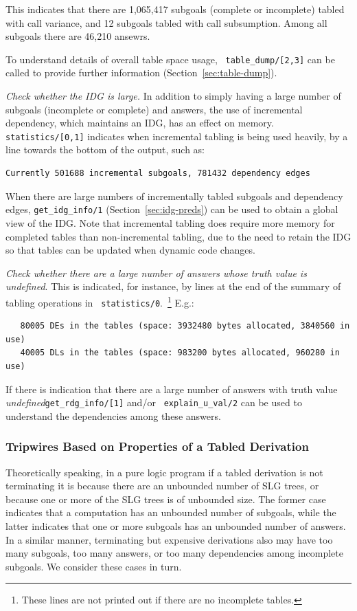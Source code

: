 This indicates that there are 1,065,417 subgoals (complete or
 incomplete) tabled with call variance, and 12 subgoals tabled with
 call subsumption.  Among all subgoals there are 46,210 ansewrs.  
%
\bi
\item To understand details of overall table space usage, {\tt
  table\_dump/[2,3]} can be called to provide further information
  (Section~\ref{sec:table-dump}).  
\ei
%
\item {\em Check whether the IDG is large.}  In addition to simply
  having a large number of subgoals (incomplete or complete) and
  answers, the use of incremental dependency, which maintains an IDG,
  has an effect on memory.  {\tt statistics/[0,1]} indicates when
  incremental tabling is being used heavily, by a line towards the
  bottom of the output, such as:
{\small \begin{verbatim}
Currently 501688 incremental subgoals, 781432 dependency edges
\end{verbatim} }
%
\bi
\item When there are large numbers of incrementally tabled subgoals
  and dependency edges, {\tt get\_idg\_info/1}
  (Section~\ref{sec:idg-preds}) can be used to obtain a global view of
  the IDG.  Note that incremental tabling does require more memory for
  completed tables than non-incremental tabling, due to the need to
  retain the IDG so that tables can be updated when dynamic code
  changes.
%
\ei
\item {\em Check whether there are a large number of answers whose
  truth value is {\em undefined}}.  This is indicated, for instance,
  by lines at the end of the summary of tabling operations in {\tt
    statistics/0}.~\footnote{These lines are not printed out if there are no
    incomplete tables.}  E.g.:
{\small \begin{verbatim}
   80005 DEs in the tables (space: 3932480 bytes allocated, 3840560 in use)
   40005 DLs in the tables (space: 983200 bytes allocated, 960280 in use)
\end{verbatim} }
%
\bi
If there is indication that there are a large number of answers with
 truth value {\em undefined}{\tt get\_rdg\_info/[1]} and/or {\tt
 explain\_u\_val/2} can be used to understand the dependencies among
 these answers.  
\ei
\ei

\subsubsection{Tripwires Based on Properties of a Tabled Derivation}
%
Theoretically speaking, in a pure logic program if a tabled derivation
 is not terminating it is because there are an unbounded number of SLG
 trees, or because one or more of the SLG trees is of unbounded size.
  The former case indicates that a computation has an unbounded number
 of subgoals, while the latter indicates that one or more subgoals has
 an unbounded number of answers.  In a similar manner, terminating but
 expensive derivations also may have too many subgoals, too many
 answers, or too many dependencies among incomplete subgoals.  We
 consider these cases in turn.

